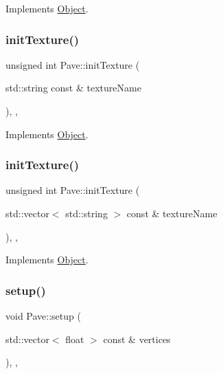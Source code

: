 Implements \hyperlink{classObject_ab1ec4e4c64ac1564d9ccad7655cfaf82}{Object}.

\mbox{\label{classPave_ae3deef5b3908954e34944051f00fea39}} 
\subsubsection{\texorpdfstring{init\+Texture()}{initTexture()}\hspace{0.1cm}{\footnotesize\ttfamily [1/2]}}
{\footnotesize\ttfamily unsigned int Pave\+::init\+Texture (\begin{DoxyParamCaption}\item[{std\+::string const \&}]{texture\+Name }\end{DoxyParamCaption})\hspace{0.3cm}{\ttfamily [override]}, {\ttfamily [protected]}, {\ttfamily [virtual]}}



Implements \hyperlink{classObject_a12b8309292a39b028d5a7b1dfca98cb1}{Object}.

\mbox{\label{classPave_a00f96f2cd410ebc8d95ebc482f79f966}} 
\subsubsection{\texorpdfstring{init\+Texture()}{initTexture()}\hspace{0.1cm}{\footnotesize\ttfamily [2/2]}}
{\footnotesize\ttfamily unsigned int Pave\+::init\+Texture (\begin{DoxyParamCaption}\item[{std\+::vector$<$ std\+::string $>$ const \&}]{texture\+Name }\end{DoxyParamCaption})\hspace{0.3cm}{\ttfamily [override]}, {\ttfamily [protected]}, {\ttfamily [virtual]}}



Implements \hyperlink{classObject_ac18935ff7831cb35dc462b581d2ccf3c}{Object}.

\mbox{\label{classPave_a1e3cc420288e7e704891cdfc2cada962}} 
\subsubsection{\texorpdfstring{setup()}{setup()}}
{\footnotesize\ttfamily void Pave\+::setup (\begin{DoxyParamCaption}\item[{std\+::vector$<$ float $>$ const \&}]{vertices }\end{DoxyParamCaption})\hspace{0.3cm}{\ttfamily [override]}, {\ttfamily [protected]}, {\ttfamily [virtual]}}



